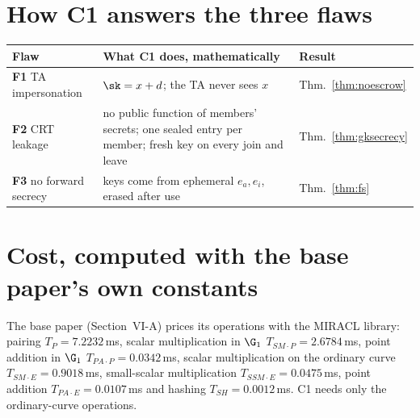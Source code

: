\section{How C1 answers the three flaws}
\begin{center}
\small
\begin{tabularx}{\linewidth}{@{}l X l@{}}
\toprule
\textbf{Flaw} & \textbf{What C1 does, mathematically} & \textbf{Result}\\
\midrule
\textcolor{bad}{\textbf{F1}} TA impersonation & $\sk=x+d$; the TA never sees $x$ & Thm.~\ref{thm:noescrow}\\
\textcolor{bad}{\textbf{F2}} CRT leakage & no public function of members' secrets; one sealed entry per member; fresh key on every join and leave & Thm.~\ref{thm:gksecrecy}\\
\textcolor{bad}{\textbf{F3}} no forward secrecy & keys come from ephemeral $e_a,e_i$, erased after use & Thm.~\ref{thm:fs}\\
\bottomrule
\end{tabularx}
\end{center}

\section{Cost, computed with the base paper's own constants}
The base paper (Section~VI-A) prices its operations with the MIRACL library: pairing $T_P=7.2232$\,ms, scalar multiplication in $\G_1$
$T_{SM\cdot P}=2.6784$\,ms, point addition in $\G_1$ $T_{PA\cdot P}=0.0342$\,ms, scalar multiplication on the ordinary curve $T_{SM\cdot E}=0.9018$\,ms,
small-scalar multiplication $T_{SSM\cdot E}=0.0475$\,ms, point addition $T_{PA\cdot E}=0.0107$\,ms and hashing $T_{SH}=0.0012$\,ms. C1 needs only the
ordinary-curve operations.

